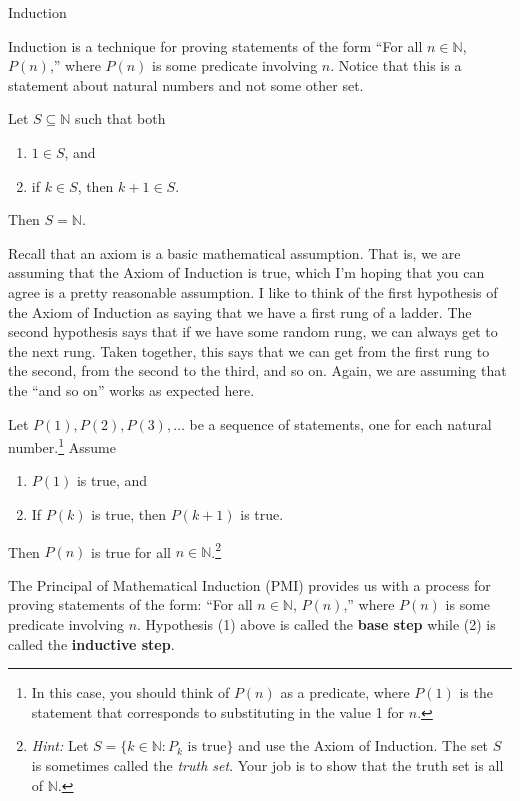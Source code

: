 \begin{section}{Induction}

Induction is a technique for proving statements of the form ``For all $n\in\mathbb{N}$, $P(n)$,'' where $P(n)$ is some predicate involving $n$.  Notice that this is a statement about natural numbers and not some other set. 

\begin{axiom}
Let $S\subseteq \mathbb{N}$ such that both
\begin{enumerate}
\item $1\in S$, and
\item if $k\in S$, then $k+1\in S$.
\end{enumerate}
Then $S=\mathbb{N}$.
\end{axiom}

\begin{remark}
Recall that an axiom is a basic mathematical assumption.  That is, we are assuming that the Axiom of Induction is true, which I'm hoping that you can agree is a pretty reasonable assumption.  I like to think of the first hypothesis of the Axiom of Induction as saying that we have a first rung of a ladder.  The second hypothesis says that if we have some random rung, we can always get to the next rung.  Taken together, this says that we can get from the first rung to the second, from the second to the third, and so on.  Again, we are assuming that the ``and so on'' works as expected here.
\end{remark}

\begin{theorem}
Let $P(1), P(2), P(3), \ldots$ be a sequence of statements, one for each natural number.\footnote{In this case, you should think of $P(n)$ as a predicate, where $P(1)$ is the statement that corresponds to substituting in the value 1 for $n$.} Assume
\begin{enumerate}
\item $P(1)$ is true, and
\item If $P(k)$ is true, then $P(k+1)$ is true.
\end{enumerate}
Then $P(n)$ is true for all $n\in\mathbb{N}$.\footnote{\emph{Hint:} Let $S=\{k\in \mathbb{N}: P_k \text{ is true}\}$ and use the Axiom of Induction.  The set $S$ is sometimes called the \emph{truth set}.  Your job is to show that the truth set is all of $\mathbb{N}$.}
\end{theorem}

\begin{remark}
The Principal of Mathematical Induction (PMI) provides us with a process for proving statements of the form: ``For all $n\in\mathbb{N}$, $P(n)$,'' where $P(n)$ is some predicate involving $n$.  Hypothesis (1) above is called the \textbf{base step} while (2) is called the \textbf{inductive step}.
\end{remark} 


\end{section}

